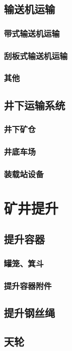 \documentclass[UTF8]{../../ApplicationUniverse}
\begin{document}
    \subsection{输送机运输}
        \subsubsection{带式输送机运输}
        \subsubsection{刮板式输送机运输}
        \subsubsection{其他}
    \subsection{井下运输系统}
        \subsubsection{井下矿仓}
        \subsubsection{井底车场}
        \subsubsection{装载站设备}

\section{矿井提升}
    \subsection{提升容器}
        \subsubsection{罐笼、箕斗}
        \subsubsection{提升容器附件}
    \subsection{提升钢丝绳}
    \subsection{天轮}
\end{document}
